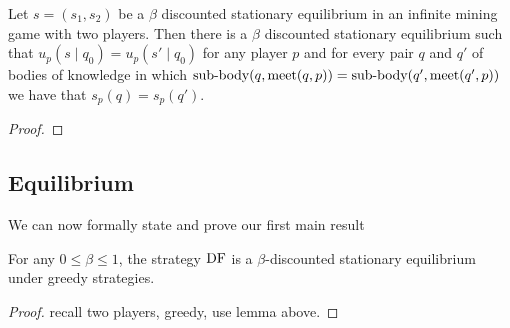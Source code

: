 \begin{mylem}
Let $s = (s_1,s_2)$ be a $\beta$ discounted stationary equilibrium in an infinite mining game with two players. 
Then there is a $\beta$ discounted stationary equilibrium such that $u_p(s \mid q_0) = u_p(s' \mid q_0)$ for 
any player $p$ and for every pair $q$ and $q'$ of 
bodies of knowledge in which ${\text{\rm sub-body}}(q,\text{\rm meet}(q,p)) = {\text{\rm sub-body}}(q',\text{\rm meet}(q',p))$ we have that 
$s_p(q) = s_p(q')$. 
\end{mylem}

\begin{proof}
\end{proof}

\subsection{Equilibrium}

We can now formally state and prove our first main result

\begin{mythm}
For any $0 \leq \beta \leq 1$, the strategy $\text{\rm DF}$ is a $\beta$-discounted stationary equilibrium under greedy strategies. 
\end{mythm} 

\begin{proof}
recall two players, greedy, use lemma above. 
\end{proof}
